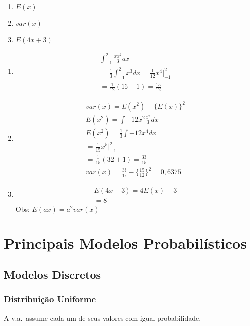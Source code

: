 \documentclass[11pt,a4paper]{book}
\begin{document}
\begin{enumerate}[label=(\alph*)]
\begin{enumerate}
\begin{enumerate}[label=(\alph*)]
  \item $E(x)$
  \item $var(x)$
  \item $E(4x+3)$
\end{enumerate}
\begin{enumerate}[label=(\alph*)]
  \item 
    \begin{align}
      \int_{-1}^{2}\frac{x x^2}{3}dx\\
      =\frac{1}{3}\int_{-1}^{2}x^3dx=\frac{1}{12} x^4 |_{-1}^{2}\\
      =\frac{1}{12}(16-1)=\frac{15}{12}
    \end{align}
  \item 
    \begin{align}
      var(x)=E(x^2)-\{E(x)\}^2\\
      E(x^2)=\int{-1}{2} x^2 \frac{x^2}{3}dx\\
      E(x^2)=\frac{1}{3}\int{-1}{2} x^4 dx\\
      =\frac{1}{15}x^5 |_{-1}^2\\
      =\frac{1}{15}(32+1)=\frac{33}{15}\\
      var(x)=\frac{33}{15}-\{\frac{15}{12}\}^2=0,6375
    \end{align}
  \item 
    \begin{align}
      E(4x+3)=4E(x)+3\\
      =8
    \end{align}
    Obs: $E(ax)= a^2 var(x)$
\end{enumerate}
\section{Principais Modelos Probabilísticos}
\subsection{Modelos Discretos}
\subsubsection{Distribuição Uniforme}
A v.a.\ assume cada um de seus valores com igual probabilidade.


\end{enumerate}
\end{enumerate}
\end{document}
